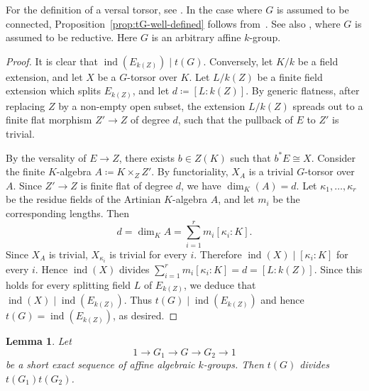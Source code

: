 \documentclass[12pt]{amsart}
\numberwithin{equation}{section}
\newtheorem{lemma}[theorem]{Lemma}
\theoremstyle{remark}
\newcommand{\ind}{\operatorname{ind}}
\begin{document}
For the definition of a versal torsor, see \cite[Definition 5.1]{serre-ci}. In the case where $G$ is assumed to be connected, Proposition~\ref{prop:tG-well-defined} follows from~\cite[Theorem 2]{grothendieck-special}. See also \cite[Theorem 1.1]{totaro-spin}, where $G$ is assumed to be reductive. Here $G$ is an arbitrary affine $k$-group.

\begin{proof}
It is clear that $\operatorname{ind}(E_{k(Z)}) \mid t(G)$. Conversely, let $K/k$ be a field extension, and let $X$ be a $G$-torsor over $K$. Let $L/k(Z)$ be a finite field extension which splits $E_{k(Z)}$, and let $d\coloneqq [L:k(Z)]$. By generic flatness, after replacing $Z$ by a non-empty open subset, the extension $L/k(Z)$ spreads out to a finite flat morphism $Z'\to Z$ of degree $d$, such that the pullback of $E$ to $Z'$ is trivial.

By the versality of $E\to Z$, there exists $b\in Z(K)$ such that $b^*E\cong X$. Consider the finite $K$-algebra $A \coloneqq K \times_Z Z'$. By functoriality, $X_A$ is a trivial $G$-torsor over $A$. Since $Z' \to Z$ is finite flat of degree $d$, we have $\dim_K(A)=d$.  Let $\kappa_1,\dots,\kappa_r$ be the residue fields of the Artinian $K$-algebra $A$, and let $m_i$ be the corresponding lengths. Then
\[
d = \dim_K A = \sum_{i=1}^r m_i [\kappa_i:K].
\]
Since $X_A$ is trivial, $X_{\kappa_i}$ is trivial for every $i$. Therefore $\operatorname{ind}(X) \mid [\kappa_i:K]$ for every $i$. Hence $\operatorname{ind}(X)$ divides $\sum_{i=1}^r m_i[\kappa_i:K] = d=[L:k(Z)]$. Since this holds for every splitting field $L$ of $E_{k(Z)}$, we deduce that $\ind(X)\mid \ind(E_{k(Z)})$. Thus $t(G)\mid \ind(E_{k(Z)})$ and hence $t(G)=\ind(E_{k(Z)})$, as desired.
\end{proof}



\begin{lemma} \label{lem.t(G)}
Let 
\[1 \longrightarrow G_1 \longrightarrow G \longrightarrow G_2 \longrightarrow 1\] be a short exact sequence of affine algebraic $k$-groups. Then $t(G)$ divides $t(G_1) t(G_2)$.
\end{lemma}
\end{document}
